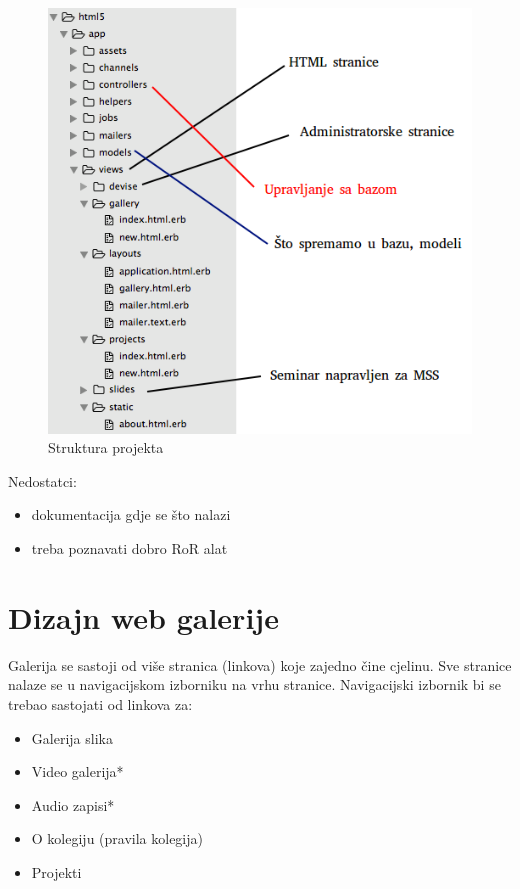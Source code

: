 \documentclass[]{article}
\begin{document}
\begin{figure}[h]
	\centering
	\includegraphics[scale=0.5]{struktura-projekta}
	\caption{Struktura projekta}
	\label{fig:mesh1}
\end{figure}

Nedostatci:
\begin{itemize}
	\item dokumentacija gdje se što nalazi
	\item treba poznavati dobro RoR alat
\end{itemize}
\newpage


\section{Dizajn web galerije}

Galerija se sastoji od više stranica (linkova) koje zajedno čine cjelinu.
Sve stranice nalaze se u navigacijskom izborniku na vrhu stranice. Navigacijski izbornik bi se trebao sastojati od linkova za:

\begin{itemize}
	\item Galerija slika
	\item Video galerija*
	\item Audio zapisi*
	\item O kolegiju (pravila kolegija)
	\item Projekti
\end{itemize}
\end{document}

